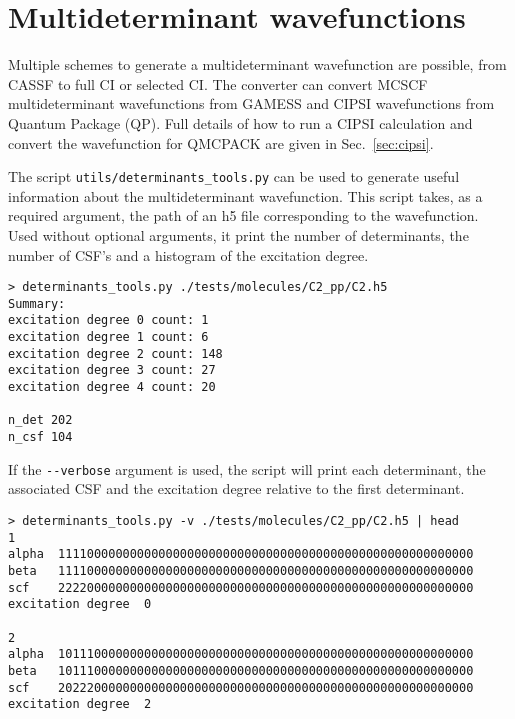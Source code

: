 \section{Multideterminant wavefunctions}
\label{sec:multideterminants}
Multiple schemes to generate a multideterminant wavefunction are
possible, from CASSF to full CI or selected CI. The \qmcpack converter can
convert MCSCF multideterminant wavefunctions from
GAMESS\cite{schmidt93} and CIPSI\cite{Caffarel2013} wavefunctions from
Quantum Package\cite{QP} (QP). Full details of how to run a CIPSI
calculation and convert the wavefunction for QMCPACK are given in 
Sec.~\ref{sec:cipsi}.

The script \verb|utils/determinants_tools.py| can be used to generate
useful information about the multideterminant wavefunction. This script takes, as a required argument, the path of an h5 file corresponding to the wavefunction. Used without optional arguments, it print the number of determinants, the number of CSF's and a histogram of the excitation degree.

\begin{lstlisting}[style=SHELL]
> determinants_tools.py ./tests/molecules/C2_pp/C2.h5
Summary:
excitation degree 0 count: 1
excitation degree 1 count: 6
excitation degree 2 count: 148
excitation degree 3 count: 27
excitation degree 4 count: 20

n_det 202
n_csf 104
\end{lstlisting}

If the \verb|--verbose| argument is used, the script will print each determinant,
the associated CSF and the excitation degree relative to the first determinant.
\begin{lstlisting}[style=SHELL]
> determinants_tools.py -v ./tests/molecules/C2_pp/C2.h5 | head
1
alpha  1111000000000000000000000000000000000000000000000000000000
beta   1111000000000000000000000000000000000000000000000000000000
scf    2222000000000000000000000000000000000000000000000000000000
excitation degree  0

2
alpha  1011100000000000000000000000000000000000000000000000000000
beta   1011100000000000000000000000000000000000000000000000000000
scf    2022200000000000000000000000000000000000000000000000000000
excitation degree  2
\end{lstlisting}
